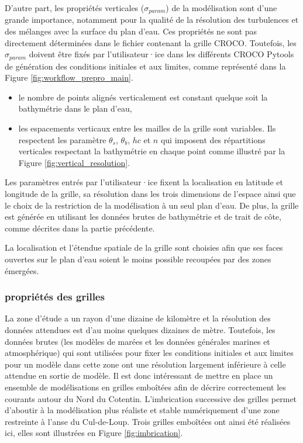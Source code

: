 \documentclass[10pt,a4paper,titlepage]{article}
\begin{document}
D'autre part, les propriétés verticales ($\sigma_{param}$) de la modélisation sont d'une grande importance, notamment pour la qualité de la résolution des turbulences et des mélanges avec la surface du plan d'eau.
Ces propriétés ne sont pas directement déterminées dans le fichier contenant la grille CROCO.
Toutefois, les $\sigma_{param}$ doivent être fixés par l'utilisateur·ice dans les différents CROCO Pytools de génération des conditions initiales et aux limites, comme représenté dans la Figure \ref{fig:workflow_prepro_main}.

\begin{itemize}
    \item le nombre de points alignés verticalement est constant quelque soit la bathymétrie dans le plan d'eau,
    \item les espacements verticaux entre les mailles de la grille sont variables. Ils respectent les paramètre $\theta_s$, $\theta_b$, $hc$ et $n$ qui imposent des répartitions verticales respectant la bathymétrie en chaque point comme illustré par la Figure \ref{fig:vertical_resolution}.
\end{itemize}


Les paramètres entrés par l'utilisateur·ice fixent la localisation en latitude et longitude de la grille, sa résolution dans les trois dimensions de l'espace ainsi que le choix de la restriction de la modélisation à un seul plan d'eau.
De plus, la grille est générée en utilisant les données brutes de bathymétrie et de trait de côte, comme décrites dans la partie précédente.

La localisation et l'étendue spatiale de la grille sont choisies afin que ses faces ouvertes sur le plan d'eau soient le moins possible recoupées par des zones émergées.


\subsubsection{propriétés des grilles}
\label{subsub:propriete_gilles_ADCL}

La zone d'étude a un rayon d'une dizaine de kilomètre et la résolution des données attendues est d'au moins quelques dizaines de mètre.
Toutefois, les données brutes (les modèles de marées et les données générales marines et atmosphérique) qui sont utilisées pour fixer les conditions initiales et aux limites pour un modèle dans cette zone ont une résolution largement inférieure à celle attendue en sortie de modèle.
Il est donc intéressant de mettre en place un ensemble de modélisations en grilles emboîtées afin de décrire correctement les courants autour du Nord du Cotentin.
L'imbrication successive des grilles permet d'aboutir à la modélisation plus réaliste et stable numériquement d'une zone restreinte à l'anse du Cul-de-Loup.
Trois grilles emboîtées ont ainsi été réalisées ici, elles sont illustrées en Figure \ref{fig:imbrication}.
\end{document}
